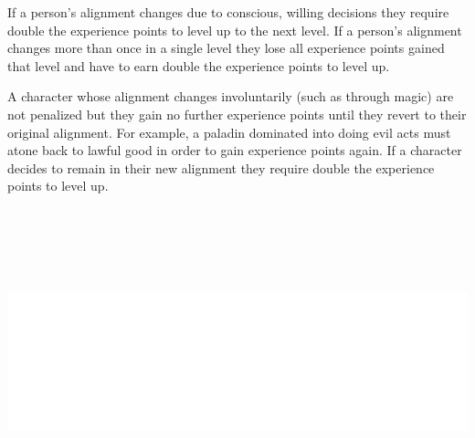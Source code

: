 \begin{multicols}{2}
If a person's alignment changes due to conscious, willing decisions they require double the experience points to level up to the next level.  If a person's alignment changes more than once in a single level they lose all experience points gained that level and have to earn double the experience points to level up.  

A character whose alignment changes involuntarily (such as through magic) are not penalized but they gain no further experience points until they revert to their original alignment.  For example, a paladin dominated into doing evil acts must atone back to lawful good in order to gain experience points again.  If a character decides to remain in their new alignment they require double the experience points to level up.

\end{multicols}

\noindent\includegraphics[width=6.75in, height=3.5in]{testblock.pdf} 
